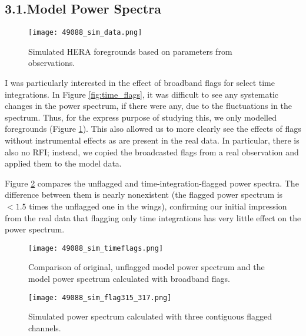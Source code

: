 \documentclass[12pt]{article}
\begin{document}
\tocless\subsection{\hypertarget{subsec:simtests}{3.1.\hspace{0.75em}Model Power Spectra}}

\begin{figure}[t]
	\centering
	\texttt{[image: 49088\_sim\_data.png]}
	\caption[Model data]{Simulated HERA foregrounds based on parameters from observations.}
	\label{fig:sim_data}
\end{figure}

I was particularly interested in the effect of broadband flags for select time integrations. In Figure \ref{fig:time_flags}, it was difficult to see any systematic changes in the power spectrum, if there were any, due to the fluctuations in the spectrum. Thus, for the express purpose of studying this, we only modelled foregrounds (Figure \ref{fig:sim_data}). This also allowed us to more clearly see the effects of flags without instrumental effects as are present in the real data. In particular, there is also no RFI; instead, we copied the broadcasted flags from a real observation and applied them to the model data.

Figure \ref{fig:sim_time_flags} compares the unflagged and time-integration-flagged power spectra. The difference between them is nearly nonexistent (the flagged power spectrum is $< 1.5$ times the unflagged one in the wings), confirming our initial impression from the real data that flagging only time integrations has very little effect on the power spectrum.

\begin{figure}[p]
	\centering
	\texttt{[image: 49088\_sim\_timeflags.png]}
	\caption[Model power spectrum calculated with data flagged only in time]{Comparison of original, unflagged model power spectrum and the model power spectrum calculated with broadband flags.}
	\label{fig:sim_time_flags}
\end{figure}

\begin{figure}[p]
	\centering
	\texttt{[image: 49088\_sim\_flag315\_317.png]}
	\caption[Model power spectrum calculated with flagged time integrations and three contiguous flagged channels]{Simulated power spectrum calculated with three contiguous flagged channels.}
	\label{fig:sim_flag_chan315_317}
\end{figure}
\end{document}

